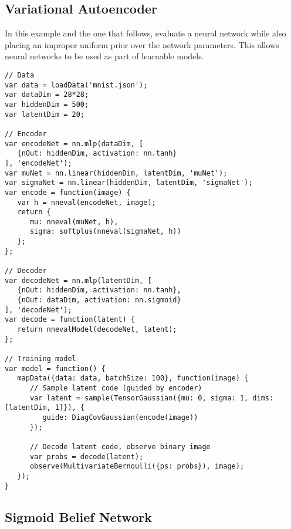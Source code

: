 \subsection{Variational Autoencoder}
\label{sec:appendix_code:vae}

In this example and the one that follows,  evaluate a neural network while also placing an improper uniform prior over the network parameters. This allows neural networks to be used as part of learnable models.

\begin{lstlisting}
// Data
var data = loadData('mnist.json');
var dataDim = 28*28;
var hiddenDim = 500;
var latentDim = 20;

// Encoder
var encodeNet = nn.mlp(dataDim, [
   {nOut: hiddenDim, activation: nn.tanh}
], 'encodeNet');
var muNet = nn.linear(hiddenDim, latentDim, 'muNet');
var sigmaNet = nn.linear(hiddenDim, latentDim, 'sigmaNet');
var encode = function(image) {
   var h = nneval(encodeNet, image);
   return {
      mu: nneval(muNet, h),
      sigma: softplus(nneval(sigmaNet, h))
   };
};

// Decoder
var decodeNet = nn.mlp(latentDim, [
   {nOut: hiddenDim, activation: nn.tanh},
   {nOut: dataDim, activation: nn.sigmoid}
], 'decodeNet');
var decode = function(latent) {
   return nnevalModel(decodeNet, latent);
};

// Training model
var model = function() {
   mapData({data: data, batchSize: 100}, function(image) {
      // Sample latent code (guided by encoder)
      var latent = sample(TensorGaussian({mu: 0, sigma: 1, dims: [latentDim, 1]}), {
         guide: DiagCovGaussian(encode(image))
      });

      // Decode latent code, observe binary image
      var probs = decode(latent);
      observe(MultivariateBernoulli({ps: probs}), image);
   });
}
\end{lstlisting}

\subsection{Sigmoid Belief Network}
\label{sec:appendix_code:sbn}


